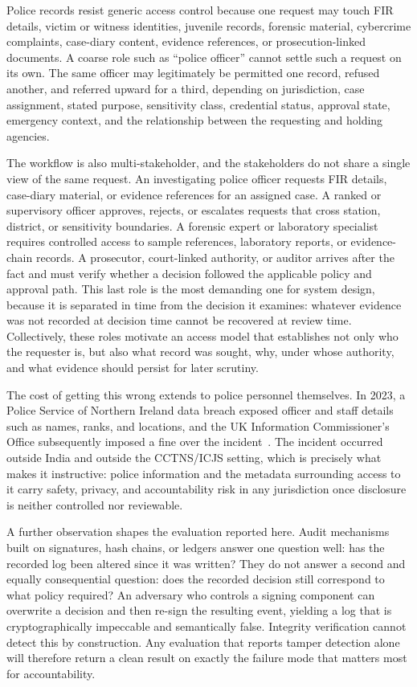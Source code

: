 Police records resist generic access control because one request may touch FIR
details, victim or witness identities, juvenile records, forensic material,
cybercrime complaints, case-diary content, evidence references, or
prosecution-linked documents. A coarse role such as ``police officer'' cannot
settle such a request on its own. The same officer may legitimately be
permitted one record, refused another, and referred upward for a third,
depending on jurisdiction, case assignment, stated purpose, sensitivity class,
credential status, approval state, emergency context, and the relationship
between the requesting and holding agencies.

The workflow is also multi-stakeholder, and the stakeholders do not share a
single view of the same request. An investigating police officer requests FIR
details, case-diary material, or evidence references for an assigned case. A
ranked or supervisory officer approves, rejects, or escalates requests that
cross station, district, or sensitivity boundaries. A forensic expert or
laboratory specialist requires controlled access to sample references,
laboratory reports, or evidence-chain records. A prosecutor, court-linked
authority, or auditor arrives after the fact and must verify whether a decision
followed the applicable policy and approval path. This last role is the most
demanding one for system design, because it is separated in time from the
decision it examines: whatever evidence was not recorded at decision time
cannot be recovered at review time. Collectively, these roles motivate an
access model that establishes not only who the requester is, but also what
record was sought, why, under whose authority, and what evidence should persist
for later scrutiny.

The cost of getting this wrong extends to police personnel themselves. In 2023,
a Police Service of Northern Ireland data breach exposed officer and staff
details such as names, ranks, and locations, and the UK Information
Commissioner's Office subsequently imposed a fine over the
incident~\cite{guardian_psni_breach_2023,ico_psni_fine_2024}. The incident
occurred outside India and outside the CCTNS/ICJS setting, which is precisely
what makes it instructive: police information and the metadata surrounding
access to it carry safety, privacy, and accountability risk in any
jurisdiction once disclosure is neither controlled nor reviewable.

A further observation shapes the evaluation reported here. Audit mechanisms
built on signatures, hash chains, or ledgers answer one question well: has the
recorded log been altered since it was written? They do not answer a second and
equally consequential question: does the recorded decision still correspond to
what policy required? An adversary who controls a signing component can
overwrite a decision and then re-sign the resulting event, yielding a log that
is cryptographically impeccable and semantically false. Integrity verification
cannot detect this by construction. Any evaluation that reports tamper
detection alone will therefore return a clean result on exactly the failure
mode that matters most for accountability.

